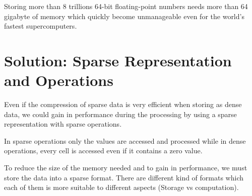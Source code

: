 Storing more than 8 trillions 64-bit floating-point numbers needs more than 64 gigabyte of memory which quickly become unmanageable even for the world's fastest supercomputers. 

\section{Solution: Sparse Representation and Operations}
Even if the compression of sparse data is very efficient when storing as dense data, we could gain in performance during the processing by using a sparse representation with sparse operations. 

In sparse operations only the values are accessed and processed while in dense operations, every cell is accessed even if it contains a zero value.

To reduce the size of the memory needed and to gain in performance, we must store the data into a sparse format. There are different kind of formats which each of them is more suitable to different aspects (Storage vs computation).




